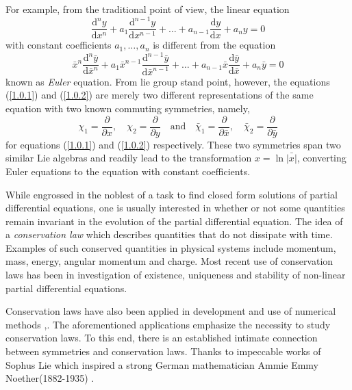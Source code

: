 For example, from the traditional point of view, the linear equation \citep{ibragimov2009practical} \begin{equation}
\frac{ \mathrm{d}^n y}{ \mathrm{d} x^n } + a_1\frac{ \mathrm{d}^{n-1} y}{ \mathrm{d} x^{n-1} } + \ldots + a_{n-1}\frac{ \mathrm{d} y}{ \mathrm{d} x }+ a_n y =0 \label{1.0.1}
\end{equation} with constant coefficients $ a_1, \ldots,a_n$ is different from the equation \begin{equation}
\bar{x}^n	\frac{ \mathrm{d}^n \bar{y}}{ \mathrm{d} \bar{x}^n } + a_1 \bar{x}^{n-1}\frac{ \mathrm{d}^{n-1} \bar{y}}{ \mathrm{d} \bar{x}^{n-1} } + \ldots + a_{n-1}\bar{x}\frac{ \mathrm{d} \bar{y}}{ \mathrm{d} \bar{x} }+ a_n \bar{y} =0  \label{1.0.2}
\end{equation} known as \textit{Euler} equation. From lie group stand point, however, the equations (\ref{1.0.1}) and (\ref{1.0.2}) are merely two different representations of the same equation with two known commuting symmetries, namely, 
\begin{equation}
\chi_1= \frac{\partial }{ \partial x}, \quad \chi_2= \frac{\partial }{ \partial y} \quad  \text{and} \quad \bar{\chi}_1= \frac{\partial }{ \partial \bar{x}}, \quad  \bar{\chi}_2= \frac{\partial }{ \partial \bar{y}} \label{1.0.3}
\end{equation} for equations (\ref{1.0.1}) and (\ref{1.0.2}) respectively. These two symmetries span two similar Lie algebras and readily lead to the transformation $ x = \ln{\bar{|x|}}$, converting Euler equations to the equation with constant coefficients.
 
 While engrossed in the noblest of a task to find closed form solutions of partial differential equations, one is usually interested in whether or not some quantities remain invariant in the evolution of the partial differential equation. The idea of a \textit{conservation law} which describes quantities that do not dissipate with time. Examples of such conserved quantities in physical systems  include momentum, mass, energy, angular momentum and charge. Most recent use of conservation laws  has been in investigation of existence, uniqueness and stability of non-linear partial differential equations. \citep{lax1968integrals} \citep{benjamin1972stability}
 
 
 Conservation laws have also been applied in development and use of numerical methods \citep{eveque1992numerical},\citep{godlewski2013numerical}. The aforementioned applications emphasize the necessity to study conservation laws. To this end, there is an established intimate connection between symmetries and conservation laws. Thanks to impeccable works of Sophus Lie which inspired a strong German mathematician Ammie Emmy Noether(1882-1935) \citep{tent2008emmy}.
 
